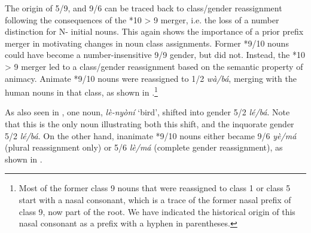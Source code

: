 \documentclass[output=paper,,modfonts,nonflat]{langsci/langscibook}
\begin{document}
The origin of 5/9, and 9/6 can be traced back to class/gender reassignment following the consequences of the *10 > 9 merger, i.e. the loss of a number distinction for N- initial nouns. This again shows the importance of a prior prefix merger in motivating changes in noun class assignments. Former *9/10 nouns could have become a number-insensitive 9/9 gender, but did not. Instead, the *10 > 9 merger led to a class/gender reassignment based on the semantic property of animacy. Animate *9/10 nouns were reassigned to 1/2 \textit{wà/bá}, merging with the human nouns in that class, as shown in .\footnote{Most of the former class 9 nouns that were reassigned to class 1 or class 5 start with a nasal consonant, which is a trace of the former nasal prefix of class 9, now part of the root. We have indicated the historical origin of this nasal consonant as a prefix with a hyphen in parentheses.}



As also seen in , one noun, \textit{lè-nyòní} `bird’, shifted into gender 5/2 \textit{lé/bá}. Note that this is the only noun illustrating both this shift, and the inquorate gender 5/2 \textit{lé/bá}. On the other hand, inanimate *9/10 nouns either became 9/6 \textit{yè/má} (plural reassignment only) or 5/6 \textit{lè/má} (complete gender reassignment), as shown in .
\end{document}
